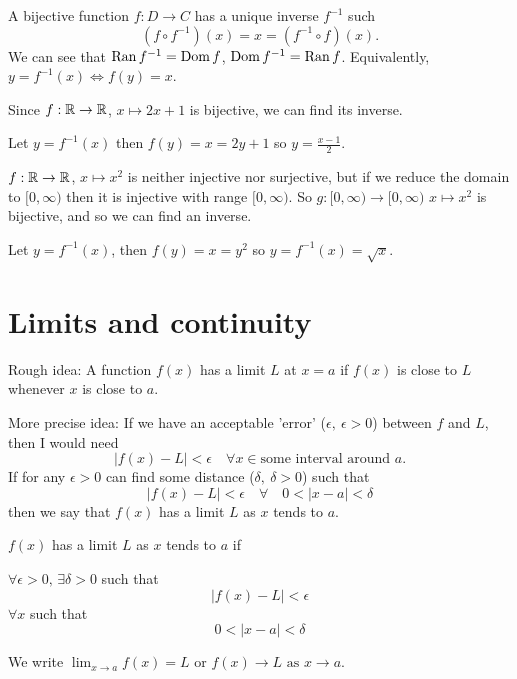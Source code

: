 \documentclass[10pt, a4paper]{article}
\begin{document}
A bijective function $f : D \rightarrow C$ has a unique inverse $f ^ {-1}$ such 
\[
(f \circ f ^ {-1})(x) = x = (f ^ {-1} \circ f)(x).
\]
We can see that $\operatorname{Ran} f ^ {-1} = \operatorname{Dom} f$, $\operatorname{Dom} f ^ {-1} = \operatorname{Ran} f$. Equivalently, $y = f ^ {-1} (x) \iff f(y) = x$.

\begin{example}
    Since $f : \mathbb{R} \rightarrow \mathbb{R}$, $x \mapsto 2x + 1$ is bijective, we can find its inverse.

    Let $y = f^{-1}(x)$ then $f(y) = x = 2y + 1$ so $y = \frac{x - 1}{2}$.
\end{example}

\begin{example}
    $f : \mathbb{R} \rightarrow \mathbb{R}$, $x \mapsto x ^ 2$ is neither injective nor surjective, but if we reduce the domain to $[0, \infty)$ then it is injective with range $[0, \infty)$. So $g : [0, \infty) \rightarrow [0, \infty)$ $x \mapsto x ^ 2$ is bijective, and so we can find an inverse.

    Let $y = f^{-1}(x)$, then $f(y) = x = y ^ 2$ so $y = f^{-1}(x) = \sqrt{x}$.
\end{example}

\newpage

\section{Limits and continuity}

Rough idea: A function $f(x)$ has a limit $L$ at $x = a$ if $f(x)$ is close to $L$ whenever $x$ is close to $a$.

More precise idea: If we have an acceptable 'error' ($\epsilon,\ \epsilon > 0$) between $f$ and $L$, then I would need
\[
|f(x) - L| < \epsilon\quad\forall x \in \text{some interval around } a.
\]
If for any $\epsilon > 0$ can find some distance ($\delta,\ \delta > 0$) such that
\[
|f(x) - L| < \epsilon\quad\forall\quad 0 < |x - a| < \delta
\]
then we say that $f(x)$ has a limit $L$ as $x$ tends to $a$.

\begin{definition}
    $f(x)$ has a limit $L$ as $x$ tends to $a$ if
    
    $\forall \epsilon > 0,\,\exists \delta > 0$ such that
    \[
    |f(x) - L| < \epsilon
    \]
    $\forall x$ such that
    \[
    0 < |x - a| < \delta
    \]
\end{definition}
We write $\displaystyle\lim_{x \rightarrow a}f(x) = L$ or $f(x) \rightarrow L \text{ as } x \rightarrow a$.
\end{document}
